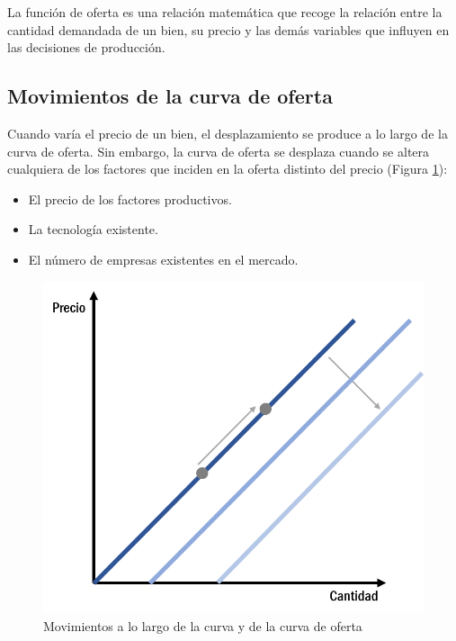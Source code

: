 \documentclass[
]{krantz}
\providecommand{\tightlist}{%
  \setlength{\itemsep}{0pt}\setlength{\parskip}{0pt}}
\begin{document}
La función de oferta es una relación matemática que recoge la relación entre la cantidad demandada de un bien, su precio y las demás variables que influyen en las decisiones de producción.

\hypertarget{movimientos-de-la-curva-de-oferta}{%
\subsection{Movimientos de la curva de oferta}\label{movimientos-de-la-curva-de-oferta}}

Cuando varía el precio de un bien, el desplazamiento se produce a lo largo de la curva de oferta. Sin embargo, la curva de oferta se desplaza cuando se altera cualquiera de los factores que inciden en la oferta distinto del precio (Figura \ref{fig:12a-04}):

\begin{itemize}
\tightlist
\item
  El precio de los factores productivos.
\item
  La tecnología existente.
\item
  El número de empresas existentes en el mercado.
\end{itemize}

\begin{figure}
\centering
\includegraphics{images/12a-04.png}
\caption{\label{fig:12a-04}Movimientos a lo largo de la curva y de la curva de oferta}
\end{figure}
\end{document}

